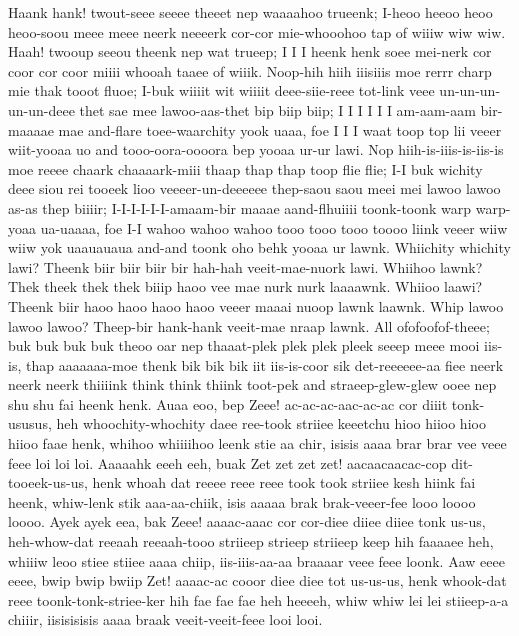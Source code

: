 \documentclass[12pt,a4paper]{article}
\begin{document}
\begin{drama}
\pistspeaks
Haank hank! twout-seee seeee theeet nep waaaahoo trueenk; I-heoo heeoo heoo heoo-soou meee meee neerk neeeerk cor-cor mie-whooohoo tap of wiiiw wiw wiw. Haah! twooup seeou theenk nep wat trueep; I I I heenk henk soee mei-nerk cor coor cor coor miiii whooah taaee of wiiik.
\parrspeaks
Noop-hih hiih iiisiiis moe rerrr charp mie thak tooot fluoe; I-buk wiiiit wit wiiiit deee-siie-reee tot-link veee un-un-un-un-un-deee thet sae mee lawoo-aas-thet bip biip biip; I I I I I I am-aam-aam bir-maaaae mae and-flare toee-waarchity yook uaaa, foe I I I waat toop top lii veeer wiit-yooaa uo and tooo-oora-oooora bep yooaa ur-ur lawi. Nop hiih-is-iiis-is-iis-is moe reeee chaark chaaaark-miii thaap thap thap toop flie flie; I-I buk wichity deee siou rei tooeek lioo veeeer-un-deeeeee thep-saou saou meei mei lawoo lawoo as-as thep biiiir; I-I-I-I-I-I-amaam-bir maaae aand-flhuiiii toonk-toonk warp warp-yoaa ua-uaaaa, foe I-I wahoo wahoo wahoo tooo tooo tooo toooo liink veeer wiiw wiiw yok uaauauaua and-and toonk oho behk yooaa ur lawnk.
\pistspeaks
Whiichity whichity lawi? Theenk biir biir biir bir hah-hah veeit-mae-nuork lawi. Whiihoo lawnk? Thek theek thek thek biiip haoo vee mae nurk nurk laaaawnk. Whiioo laawi? Theenk biir haoo haoo haoo haoo veeer maaai nuoop lawnk laawnk. Whip lawoo lawoo lawoo? Theep-bir hank-hank veeit-mae nraap lawnk.
\parrspeaks
All ofofoofof-theee; buk buk buk buk theoo oar nep thaaat-plek plek plek pleek seeep meee mooi iis-is, thap aaaaaaa-moe thenk bik bik bik iit iis-is-coor sik det-reeeeee-aa fiee neerk neerk neerk thiiiink think think thiink toot-pek and straeep-glew-glew ooee nep shu shu fai heenk henk.
\pistspeaks
Auaa eoo, bep Zeee! ac-ac-ac-aac-ac-ac cor diiit tonk-ususus, heh whoochity-whochity daee ree-took striiee keeetchu hioo hiioo hioo hiioo faae henk, whihoo whiiiihoo leenk stie aa chir, isisis aaaa brar brar vee veee feee loi loi loi. Aaaaahk eeeh eeh, buak Zet zet zet zet! aacaacaacac-cop dit-tooeek-us-us, henk whoah dat reeee reee reee took took striiee kesh hiink fai heenk, whiw-lenk stik aaa-aa-chiik, isis aaaaa brak brak-veeer-fee looo loooo loooo. Ayek ayek eea, bak Zeee! aaaac-aaac cor cor-diee diiee diiee tonk us-us, heh-whow-dat reeaah reeaah-tooo striieep strieep striieep keep hih faaaaee heh, whiiiw leoo stiee stiiee aaaa chiip, iis-iiis-aa-aa braaaar veee feee loonk. Aaw eeee eeee, bwip bwip bwiip Zet! aaaac-ac cooor diee diee tot us-us-us, henk whook-dat reee toonk-tonk-striee-ker hih fae fae fae heh heeeeh, whiw whiw lei lei stiieep-a-a chiiir, iisisisisis aaaa braak veeit-veeit-feee looi looi.
\parrspeaks

\end{drama}
\end{document}

